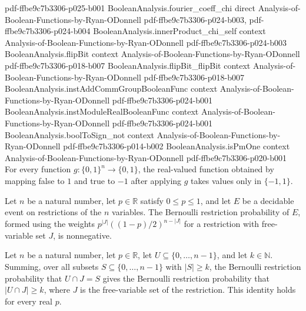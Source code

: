 \begin{lemma}
{    pdf-ffbe9c7b3306-p025-b001}
\proofstep
  {BooleanAnalysis.fourier_coeff_chi}
  {direct}
  {Analysis-of-Boolean-Functions-by-Ryan-ODonnell}
  {pdf-ffbe9c7b3306-p024-b003,
    pdf-ffbe9c7b3306-p024-b004}
\proofstep
  {BooleanAnalysis.innerProduct_chi_self}
  {context}
  {Analysis-of-Boolean-Functions-by-Ryan-ODonnell}
  {pdf-ffbe9c7b3306-p024-b003}
\proofstep
  {BooleanAnalysis.flipBit}
  {context}
  {Analysis-of-Boolean-Functions-by-Ryan-ODonnell}
  {pdf-ffbe9c7b3306-p018-b007}
\proofstep
  {BooleanAnalysis.flipBit_flipBit}
  {context}
  {Analysis-of-Boolean-Functions-by-Ryan-ODonnell}
  {pdf-ffbe9c7b3306-p018-b007}
\proofstep
  {BooleanAnalysis.instAddCommGroupBooleanFunc}
  {context}
  {Analysis-of-Boolean-Functions-by-Ryan-ODonnell}
  {pdf-ffbe9c7b3306-p024-b001}
\proofstep
  {BooleanAnalysis.instModuleRealBooleanFunc}
  {context}
  {Analysis-of-Boolean-Functions-by-Ryan-ODonnell}
  {pdf-ffbe9c7b3306-p024-b001}
\proofstep
  {BooleanAnalysis.boolToSign_not}
  {context}
  {Analysis-of-Boolean-Functions-by-Ryan-ODonnell}
  {pdf-ffbe9c7b3306-p014-b002}
\proofstep
  {BooleanAnalysis.isPmOne}
  {context}
  {Analysis-of-Boolean-Functions-by-Ryan-ODonnell}
  {pdf-ffbe9c7b3306-p020-b001}
For every function $g:\{0,1\}^n\to\{0,1\}$, the real-valued function obtained by mapping
false to $1$ and true to $-1$ after applying $g$ takes values only in $\{-1,1\}$.
\end{lemma}

\begin{lemma}
\label{RestrictionFourier.bernoulliRestrProb_nonneg}
\leanok
{}
Let $n$ be a natural number, let $p\in\mathbb{R}$ satisfy $0\le p\le 1$, and let $E$ be
a decidable event on restrictions of the $n$ variables. The Bernoulli restriction
probability of $E$, formed using the weights $p^{|J|}((1-p)/2)^{n-|J|}$ for a
restriction with free-variable set $J$, is nonnegative.
\end{lemma}

\begin{lemma}
\label{RestrictionFourier.sum_prob_inter_eq_card_ge}
\leanok
{}
Let $n$ be a natural number, let $p\in\mathbb{R}$, let $U\subseteq\{0,\ldots,n-1\}$, and
let $k\in\mathbb{N}$. Summing, over all subsets $S\subseteq\{0,\ldots,n-1\}$ with
$|S|\ge k$, the Bernoulli restriction probability that $U\cap J=S$ gives the Bernoulli
restriction probability that $|U\cap J|\ge k$, where $J$ is the free-variable set of the
restriction. This identity holds for every real $p$.
\end{lemma}

